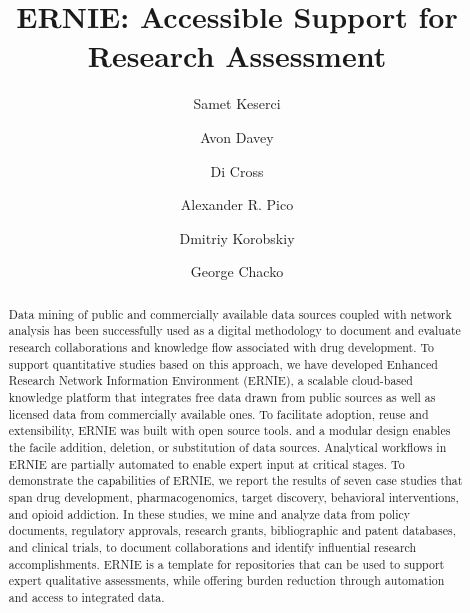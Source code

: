 \documentclass[review]{elsarticle}
\begin{document}
\begin{frontmatter}

\title{ERNIE: Accessible Support for Research Assessment} 

\author[nl]{Samet Keserci}
\author[nl]{Avon Davey}
\author[ca]{Di Cross}
\author[gi]{Alexander R. Pico}
\author[nl]{Dmitriy Korobskiy}
\author[nl]{George Chacko }



\address[nl]{NETE Labs, NET ESolutions Corporation, McLean, VA, USA}
\address[ca]{Research Data Science \& Evaluation, Clarivate Analytics, USA}
\address[gi]{Gladstone Institutes, San Francisco, CA, USA}

\raggedright

\begin{abstract}

Data mining of public and commercially available data sources coupled with network analysis has been successfully used as a digital methodology to document and evaluate research collaborations and knowledge flow associated with drug development. To support quantitative studies based on this approach, we have developed Enhanced Research Network Information Environment (ERNIE), a scalable cloud-based knowledge platform that integrates free data drawn from public sources as well as licensed data from commercially available ones. To facilitate adoption, reuse and extensibility, ERNIE was built with open source tools. and a modular design enables the facile addition, deletion, or substitution of data sources. Analytical workflows in ERNIE are partially automated to enable expert input at critical stages. To demonstrate the capabilities of ERNIE, we report the results of seven case studies that span drug development, pharmacogenomics, target discovery, behavioral interventions, and opioid addiction. In these studies, we mine and analyze data from policy documents, regulatory approvals, research grants, bibliographic and patent databases, and clinical trials, to document collaborations and identify influential research accomplishments. ERNIE is a template for repositories that can be used to support expert qualitative assessments, while offering burden reduction through automation and access to integrated data.

\end{abstract}


\end{frontmatter}       
\end{document}
